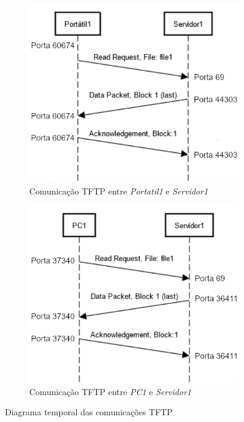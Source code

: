         \begin{figure}
            \vspace{-10pt}
             \centering
             \begin{subfigure}[b]{0.45\textwidth}
                 \centering
                 \includegraphics[width=\textwidth]{Imagens/9.png}
                 \caption*{Comunicação TFTP entre \textit{Portatil1} e \textit{Servidor1}}
             \end{subfigure}
             \hfill
             \begin{subfigure}[b]{0.45\textwidth}
                 \centering
                 \includegraphics[width=\textwidth]{Imagens/10.png}
                 \caption*{Comunicação TFTP entre \textit{PC1} e \textit{Servidor1}}
             \end{subfigure}
             \caption{Diagrama temporal das comunicações TFTP}
             \vspace{-10pt}
        \end{figure}

